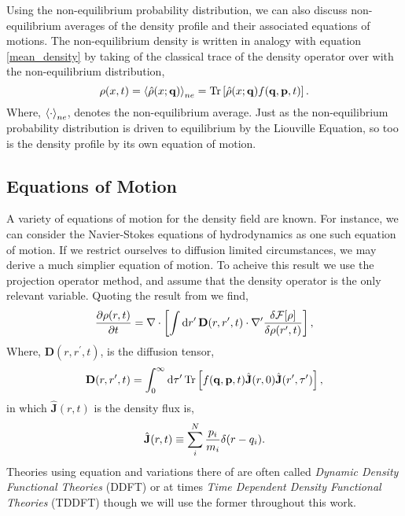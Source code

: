 Using the non-equilibrium probability distribution, we can also discuss
non-equilibrium averages of the density profile and their associated equations
of motions. The non-equilibrium density is written in analogy with equation
\ref{mean_density} by taking of the classical trace of the density operator
over with the non-equilibrium distribution,
%
\begin{equation}
    \rho(x, t) = \left\langle \hat{\rho}(x; \mathbf{q}) \right\rangle_{ne} =
        \mathrm{Tr}\left[ \hat{\rho}(x; \mathbf{q}) f(\mathbf{q}, \mathbf{p}, t) \right].
\end{equation}
%
Where, $\left\langle \cdot \right\rangle_{ne}$, denotes the non-equilibrium average. Just as the
non-equilibrium probability distribution is driven to equilibrium by the
Liouville Equation, so too is the density profile by its own equation of
motion.

\subsection{Equations of Motion} %

A variety of equations of motion for the density field are known.  For
instance, we can consider the Navier-Stokes equations of hydrodynamics as one
such equation of motion. If we restrict ourselves to diffusion limited
circumstances, we may derive a much simplier equation of motion. To acheive
this result we use the projection operator method, and assume that the 
density operator is the only relevant variable. Quoting the result from
\cite{ESPANOL09} we find,
%
\begin{equation}
    \label{eq:mean_eom}
    \frac{\partial \rho(r, t)}{\partial t} = 
        \nabla \cdot \left[\int \mathrm{d}r^\prime\, \mathbf{D}(r, r^\prime, t) 
        \cdot \nabla^\prime \frac{\delta \mathcal{F}[\rho]}{\delta \rho(r^\prime, t)}\right],
\end{equation}
%
Where, $\mathbf{D}(r, r^\prime, t)$, is the diffusion tensor,
%
\begin{equation}
    \mathbf{D}(r, r^\prime, t) = \int_0^\infty \mathrm{d}\tau^\prime\,
        \mathrm{Tr}\left[ f(\mathbf{q}, \mathbf{p}, t)\hat{\mathbf{J}}(r, 0)
        \hat{\mathbf{J}}(r^\prime, \tau^\prime) \right],
\end{equation}
%
in which $\hat{\mathbf{J}}(r, t)$ is the density flux is,
%
\begin{equation}
    \hat{\mathbf{J}}(r, t) \equiv 
        \sum_i^N \frac{p_i}{m_i} \delta(r - q_i).
\end{equation}
%
Theories using equation \label{eq:main_eom} and variations there of are
often called \textit{Dynamic Density Functional Theories} (DDFT) or at times
\textit{Time Dependent Density Functional Theories} (TDDFT) though we will
use the former throughout this work.

